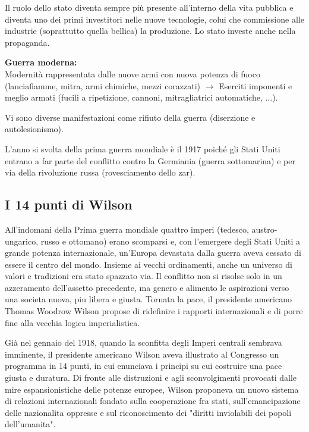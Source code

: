 \documentclass[a4paper]{article}
\begin{document}
Il ruolo dello stato diventa sempre più presente
all'interno della vita pubblica e diventa uno dei primi investitori
nelle nuove tecnologie, colui che commissione alle industrie (soprattutto quella bellica)
la produzione.
Lo stato investe anche nella propaganda.

\textbf{Guerra moderna:} \\
Modernità rappresentata dalle nuove armi con nuova potenza di fuoco
(lanciafiamme, mitra, armi chimiche, mezzi corazzati)
\(\rightarrow\) Eserciti imponenti e meglio armati (fucili a ripetizione, cannoni, mitragliatrici automatiche, ...).

Vi sono diverse manifestazioni come rifiuto della guerra (diserzione e autolesionismo).



L'anno si svolta della prima guerra mondiale è il 1917 poiché
gli Stati Uniti entrano a far parte del conflitto contro la Germiania (guerra sottomarina)
e per via della rivoluzione russa (rovesciamento dello zar).

\pagebreak

\subsection{I 14 punti di Wilson}

All'indomani della Prima guerra mondiale quattro imperi (tedesco, austro-ungarico, russo e
ottomano) erano scomparsi e, con l'emergere degli Stati Uniti a grande potenza internazionale,
un'Europa devastata dalla guerra aveva cessato di essere il centro del mondo. Insieme ai vecchi
ordinamenti, anche un universo di valori e tradizioni era stato spazzato via. Il conflitto non si
risolse solo in un azzeramento dell'assetto precedente, ma genero e alimento le aspirazioni
verso una societa nuova, piu libera e giusta. Tornata la pace, il presidente americano Thomas
Woodrow Wilson propose di ridefinire i rapporti internazionali e di porre fine alla vecchia
logica imperialistica.

Già nel gennaio del 1918, quando la sconfitta degli Imperi centrali sembrava imminente, il
presidente americano Wilson aveva illustrato al Congresso un programma in 14 punti, in cui
enunciava i principi su cui costruire una pace giusta e duratura. Di fronte alle distruzioni e agli
sconvolgimenti provocati dalle mire espansionistiche delle potenze europee, Wilson proponeva
un nuovo sistema di relazioni internazionali fondato sulla cooperazione fra stati,
sull'emancipazione delle nazionalita oppresse e sul riconoscimento dei "diritti inviolabili dei
popoli dell'umanita".
\end{document}
